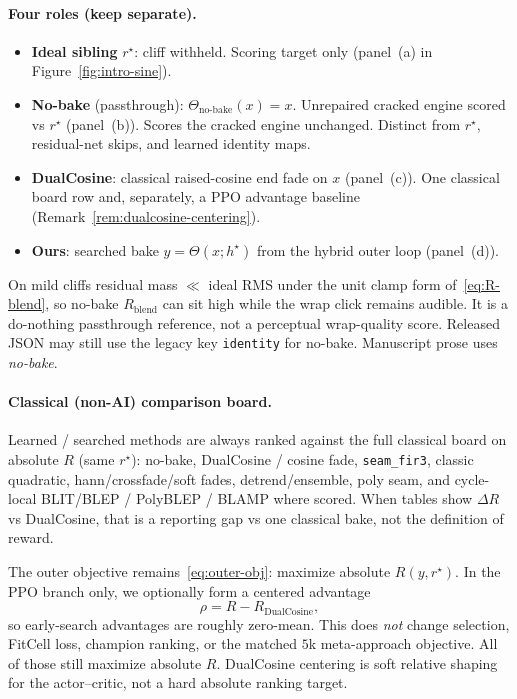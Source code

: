 \paragraph{Four roles (keep separate).}
\label{sec:four-roles}
\begin{itemize}
  \item \textbf{Ideal sibling} $r^{\star}$: cliff withheld. Scoring target only (panel~(a) in Figure~\ref{fig:intro-sine}).
  \item \textbf{No-bake} (passthrough): $\Theta_{\mathrm{no\text{-}bake}}(x)=x$. Unrepaired cracked engine scored vs $r^{\star}$ (panel~(b)). Scores the cracked engine unchanged. Distinct from $r^{\star}$, residual-net skips, and learned identity maps.
  \item \textbf{DualCosine}: classical raised-cosine end fade on $x$ (panel~(c)). One classical board row and, separately, a PPO advantage baseline (Remark~\ref{rem:dualcosine-centering}).
  \item \textbf{Ours}: searched bake $y=\Theta(x;h^{\star})$ from the hybrid outer loop (panel~(d)).
\end{itemize}
On mild cliffs residual mass $\ll$ ideal RMS under the unit clamp form of~\eqref{eq:R-blend}, so no-bake $R_{\mathrm{blend}}$ can sit high while the wrap click remains audible.
It is a do-nothing passthrough reference, not a perceptual wrap-quality score.
Released JSON may still use the legacy key \texttt{identity} for no-bake. Manuscript prose uses \emph{no-bake}.

\paragraph{Classical (non-AI) comparison board.}
\label{sec:classical-board}
Learned / searched methods are always ranked against the full classical board on absolute $R$ (same $r^{\star}$):
no-bake, DualCosine / cosine fade, \texttt{seam\_fir3}, classic quadratic, hann/crossfade/soft fades, detrend/ensemble, poly seam, and cycle-local BLIT/BLEP / PolyBLEP / BLAMP where scored.
When tables show $\Delta R$ vs DualCosine, that is a reporting gap vs one classical bake, not the definition of reward.

\begin{remark}
\label{rem:dualcosine-centering}
The outer objective remains~\eqref{eq:outer-obj}: maximize absolute $R(y,r^{\star})$.
In the PPO branch only, we optionally form a centered advantage
\begin{equation}
\label{eq:dualcosine-centering}
\rho = R - R_{\mathrm{DualCosine}},
\end{equation}
so early-search advantages are roughly zero-mean.
This does \emph{not} change selection, FitCell loss, champion ranking, or the matched $5$k meta-approach objective.
All of those still maximize absolute $R$.
DualCosine centering is soft relative shaping for the actor--critic, not a hard absolute ranking target.
\end{remark}

